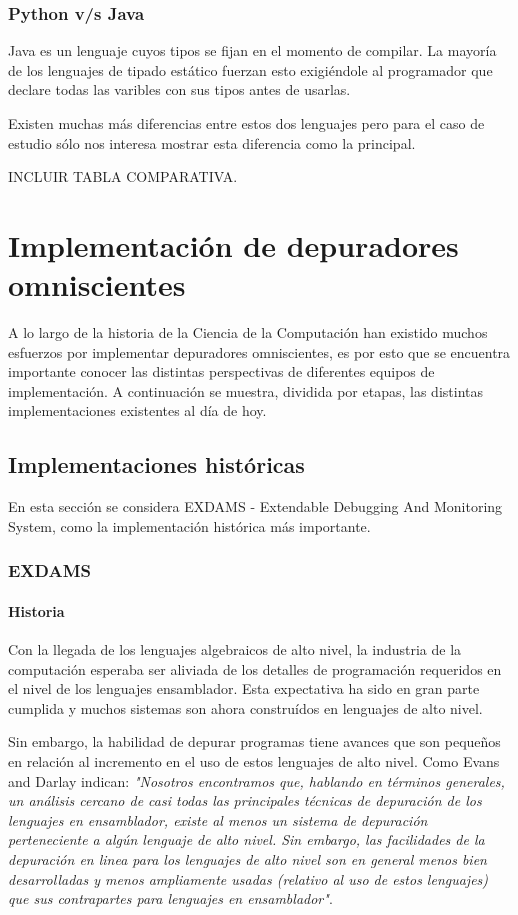 \documentclass[12pt,legalpaper]{report}
\begin{document}
		\subsection{Python v/s Java}

Java es un lenguaje cuyos tipos se fijan en el momento de compilar. La mayoría de los lenguajes de tipado estático fuerzan esto exigiéndole al programador que declare todas las varibles con sus tipos antes de usarlas. 

Existen muchas más diferencias entre estos dos lenguajes pero para el caso de estudio sólo nos interesa mostrar esta diferencia como la principal.

INCLUIR TABLA COMPARATIVA.

\chapter{Implementación de depuradores omniscientes}

A lo largo de la historia de la Ciencia de la Computación han existido muchos esfuerzos por implementar depuradores omniscientes, es por esto que se encuentra importante conocer las distintas perspectivas de diferentes equipos de implementación.  A continuación se muestra, dividida por etapas, las distintas implementaciones existentes al día de hoy.

	\section{Implementaciones históricas}

En esta sección se considera EXDAMS - Extendable Debugging And Monitoring System, como la implementación histórica más importante.

		\subsection{EXDAMS}
			\subsubsection{Historia}

Con la llegada de los lenguajes algebraicos de alto nivel, la industria de la computación esperaba ser aliviada de los detalles de programación requeridos en el nivel de los lenguajes ensamblador.  Esta expectativa ha sido en gran parte cumplida y muchos sistemas son ahora construídos en lenguajes de alto nivel.

Sin embargo, la habilidad de depurar programas tiene avances que son pequeños en relación al incremento en el uso de estos lenguajes de alto nivel.  Como Evans and Darlay \cite{} indican:
\textit{"Nosotros encontramos que, hablando en términos generales, un análisis cercano de casi todas las principales técnicas de depuración de los lenguajes en ensamblador, existe al menos un sistema de depuración perteneciente a algún lenguaje de alto nivel.  Sin embargo, las facilidades de la depuración en linea para los lenguajes de alto nivel son en general menos bien desarrolladas y menos ampliamente usadas (relativo al uso de estos lenguajes) que sus contrapartes para lenguajes en ensamblador"}.
\end{document}
